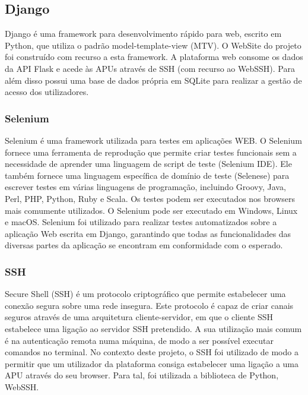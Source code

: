 \subsection{Django}
Django é uma framework para desenvolvimento rápido para web, escrito em Python, que utiliza o padrão model-template-view (MTV).\newline
O WebSite do projeto foi construído com recurso a esta framework. A plataforma web  consome os dados da API Flask e acede às APUs através de SSH (com recurso ao WebSSH). Para além disso possui uma  base de dados própria em SQLite para realizar a gestão de acesso dos utilizadores.


\subsubsection{Selenium}
Selenium é uma framework utilizada para testes em aplicações WEB. O Selenium fornece uma ferramenta de reprodução que permite criar testes funcionais sem a necessidade de aprender uma linguagem de script de teste (Selenium IDE). Ele também fornece uma linguagem específica de domínio de teste (Selenese) para escrever testes em várias linguagens de programação, incluindo Groovy, Java, Perl, PHP, Python, Ruby e Scala. Os testes podem ser executados nos browsers mais comumente utilizados. O Selenium pode ser executado em Windows, Linux e macOS.\newline
Selenium foi utilizado para realizar testes automatizados sobre a aplicação Web escrita em Django, garantindo que todas as funcionalidades das diversas partes da aplicação se encontram em conformidade com o esperado.

\subsubsection{SSH}
Secure Shell (SSH) é um protocolo criptográfico que permite estabelecer uma conexão segura sobre uma rede insegura. Este protocolo é capaz de criar canais seguros através de uma arquitetura cliente-servidor, em que o cliente SSH estabelece uma ligação ao servidor SSH pretendido. A sua utilização mais comum é na autenticação remota numa máquina, de modo a ser possível executar comandos no terminal.\newline
No contexto deste projeto, o SSH foi utilizado de modo a permitir que um utilizador da plataforma consiga estabelecer uma ligação a uma APU através do seu browser. Para tal, foi utilizada a biblioteca de Python, WebSSH. 


